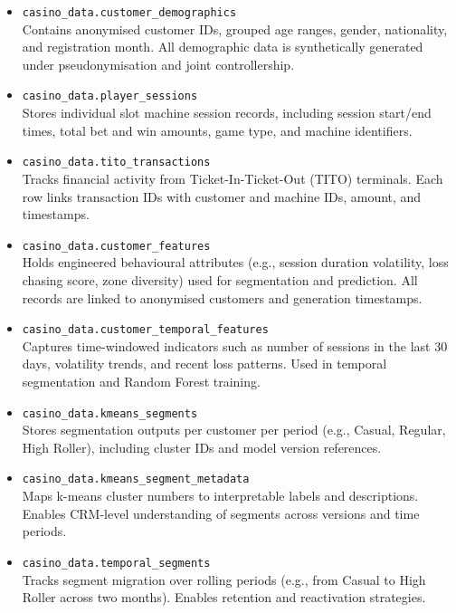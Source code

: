 \documentclass[12pt,a4paper]{report}
\begin{document}
\begin{itemize}

\item \texttt{casino\_data.customer\_demographics} \\
Contains anonymised customer IDs, grouped age ranges, gender, nationality, and registration month. All demographic data is synthetically generated under pseudonymisation and joint controllership.

\item \texttt{casino\_data.player\_sessions} \\
Stores individual slot machine session records, including session start/end times, total bet and win amounts, game type, and machine identifiers.

\item \texttt{casino\_data.tito\_transactions} \\
Tracks financial activity from Ticket-In-Ticket-Out (TITO) terminals. Each row links transaction IDs with customer and machine IDs, amount, and timestamps.

\item \texttt{casino\_data.customer\_features} \\
Holds engineered behavioural attributes (e.g., session duration volatility, loss chasing score, zone diversity) used for segmentation and prediction. All records are linked to anonymised customers and generation timestamps.

\item \texttt{casino\_data.customer\_temporal\_features} \\
Captures time-windowed indicators such as number of sessions in the last 30 days, volatility trends, and recent loss patterns. Used in temporal segmentation and Random Forest training.

\item \texttt{casino\_data.kmeans\_segments} \\
Stores segmentation outputs per customer per period (e.g., Casual, Regular, High Roller), including cluster IDs and model version references.

\item \texttt{casino\_data.kmeans\_segment\_metadata} \\
Maps k-means cluster numbers to interpretable labels and descriptions. Enables CRM-level understanding of segments across versions and time periods.

\item \texttt{casino\_data.temporal\_segments} \\
Tracks segment migration over rolling periods (e.g., from Casual to High Roller across two months). Enables retention and reactivation strategies.


\end{itemize}
\end{document}
